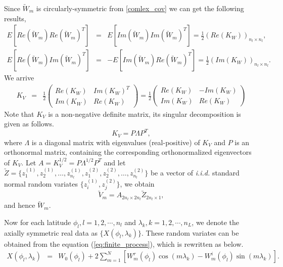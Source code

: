 Since $\utilde{W}_m$ is circularly-symmetric from \eqref{comlex_cov} we can get the following results,
\begin{eqnarray*}		
E[Re(\utilde{W}_m)Re(\utilde{W}_m)^T] &=& E[Im(\utilde{W}_m)Im(\utilde{W}_m)^T] = \frac{1}{2}(Re(K_W))_{n_{l}\times n_{l}}, \\
E[Re(\utilde{W}_m)Im(\utilde{W}_m)^T] &=& -E[Im(\utilde{W}_m)Re(\utilde{W}_m)^T] = \frac{1}{2}(Im(K_W))_{n_{l}\times n_{l}}.
\end{eqnarray*}
We arrive			
	\begin{eqnarray*}
		K_V&=& \frac{1}{2}\left( \begin{array}{ll}
		Re(K_W) & Im(K_W)^T \\
		Im(K_W) & Re(K_W)
		\end{array}
		\right) = \frac{1}{2}\left( \begin{array}{ll}
		Re(K_W) & -Im(K_W) \\
		Im(K_W) & Re(K_W)
		\end{array}
		\right)
	\end{eqnarray*}
Note that $K_V$ is a non-negative definite matrix, its singular decomposition is given as follows.
	\[ 
	K_V = P\Lambda P^T, 
	\]
where $\Lambda$ is a diagonal matrix with eigenvalues (real-positive) of $K_V$ and $P$ is an orthonormal matrix, containing the corresponding orthonormalized eigenvectors of $K_V$. Let $A = K_V^{1/2} = P\Lambda^{1/2} P^T$ and let $\utilde{Z} =\{z_1^{(1)}, z_2^{(1)}, \ldots, z_{n_l}^{(1)}, z_1^{(2)}, z_2^{(2)}, \ldots, z_{n_l}^{(2)}\}$ be a vector of {\em i.i.d.} standard normal random variates $\{z_i^{(1)}, z_j^{(2)}\}$, we obtain 
	\[\utilde{V}_m=A_{2n_{l}\times 2n_{l}}\utilde{Z}_{2n_{l}\times 1},\]
and hence $\utilde{W}_m$.

Now for each latitude $\phi_l, l = 1, 2, \cdots, n_l$ and $\lambda_k, k = 1, 2, \cdots, n_L$, we denote the axially symmetric real data as $\{X(\phi_l, \lambda_k)\}$. These random variates can be obtained from the equation (\ref{eq:finite_process}), which is rewritten as below.
	\begin{eqnarray} \label{eq:finite_process_2}
		X(\phi_l,\lambda_k) &=& W_0(\phi_l) + 2 \sum_{m =1}^N \left[W_m^r(\phi_l)\cos(m\lambda_k) - W_m^i(\phi_l)\sin(m \lambda_k)\right].
	\end{eqnarray}
		
	
